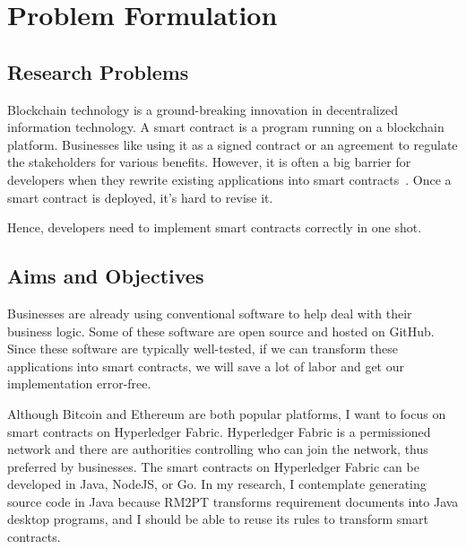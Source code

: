 \chapter{Problem Formulation}

\section{Research Problems}

Blockchain technology is a ground-breaking innovation in decentralized information technology.
A smart contract is a program running on a blockchain platform.
Businesses like using it as a signed contract or an agreement to regulate the stakeholders for various benefits.
However, it is often a big barrier for developers when they rewrite existing applications into smart contracts~\cite{dao2019challenges}.
Once a smart contract is deployed, it's hard to revise it.

Hence, developers need to implement smart contracts correctly in one shot.





\section{Aims and Objectives}

Businesses are already using conventional software to help deal with their business logic.
Some of these software are open source and hosted on GitHub.
Since these software are typically well-tested, if we can transform these applications into smart contracts, we will save a lot of labor and get our implementation error-free.

Although Bitcoin and Ethereum are both popular platforms, I want to focus on smart contracts on Hyperledger Fabric.
Hyperledger Fabric is a permissioned network and there are authorities controlling who can join the network, thus preferred by businesses.
The smart contracts on Hyperledger Fabric can be developed in Java, NodeJS, or Go.
In my research, I contemplate generating source code in Java because RM2PT transforms requirement documents into Java desktop programs,
and I should be able to reuse its rules to transform smart contracts.

